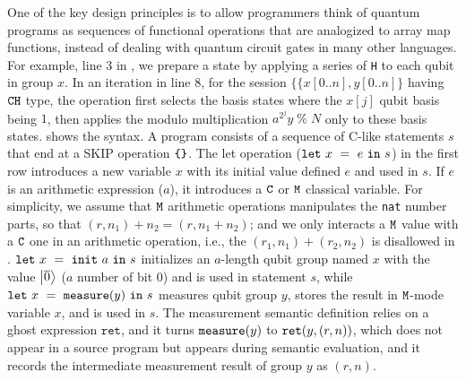  One of the key \qafny design principles is to allow programmers think of quantum programs as sequences of functional operations that are analogized to array map functions, instead of dealing with quantum circuit gates in many other languages.
For example, line 3 in , we prepare a state by applying a series of \texttt{H} to each qubit in group $x$. In an iteration in line 8, for the session $\{\{x[0..n],y[0..n]\}$ having $\texttt{CH}$ type, the operation first selects the basis states where the $x[j]$ qubit basis being $1$, then applies the modulo multiplication ${a^{2^j}y\;\%\; N}$ only to these basis states.
 shows the \qafny syntax.
A program consists of a sequence of C-like statements $s$ that end at a SKIP operation $\texttt{\{\}}$.
The let operation ($\texttt{let}~{x}~=~{e}~\texttt{in}~{s}$) in the first row introduces a new variable $x$ with its initial value defined $e$ and used in $s$. If $e$ is an arithmetic expression ($a$), it introduces a $\texttt{C}$ or $\texttt{M}$ classical variable. For simplicity, we assume that $\texttt{M}$ arithmetic operations manipulates the \texttt{nat} number parts, so that $(r,n_1)+n_2=(r,n_1+n_2)$; and we only interacts a $\texttt{M}$ value with a $\texttt{C}$ one in an arithmetic operation, i.e., the $(r_1,n_1)+(r_2,n_2)$ is disallowed in \qafny. $\texttt{let}~{x}~=~{\texttt{init}~{a}}~\texttt{in}~{s}$ initializes an $a$-length qubit group named $x$ with the value $\left\vert{\overline{0}}\right\rangle$ ($a$ number of bit $0$) and is used in statement $s$, while $\texttt{let}~{x}~=~{\texttt{measure}(y)}~\texttt{in}~{s}$ measures qubit group $y$, stores the result in $\texttt{M}$-mode variable $x$, and is used in $s$.
The measurement semantic definition relies on a ghost expression $\texttt{ret}$, and it turns $\texttt{measure}(y)$ to $\texttt{ret}(y,(r,n))$, which does not appear in a \qafny source program but appears during semantic evaluation, and it records the intermediate measurement result of group $y$ as $(r,n)$.

